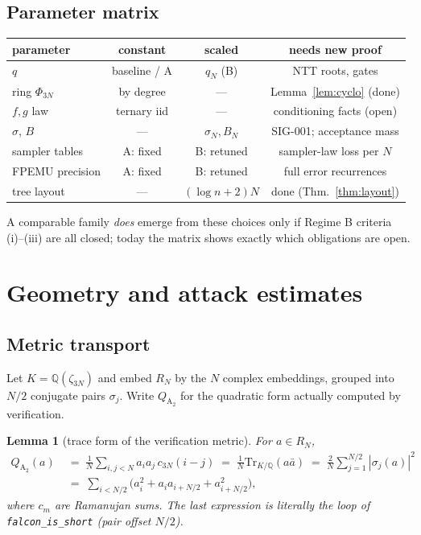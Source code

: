 \documentclass[11pt,a4paper]{article}
\newtheorem{lemma}{Lemma}
\theoremstyle{remark}
\newcommand{\Atwo}{Q_{\mathrm{A}_2}}
\begin{document}
\subsection{Parameter matrix}
\begin{center}
\begin{tabular}{lccc}
\toprule
parameter & constant & scaled & needs new proof \\
\midrule
$q$ & baseline / A & $q_N$ (B) & NTT roots, gates \\
ring $\Phi_{3N}$ & by degree & --- & Lemma~\ref{lem:cyclo} (done) \\
$f,g$ law & ternary iid & --- & conditioning facts (open) \\
$\sigma$, $B$ & --- & $\sigma_N,B_N$ & SIG-001; acceptance mass \\
sampler tables & A: fixed & B: retuned & sampler-law loss per $N$ \\
FPEMU precision & A: fixed & B: retuned & full error recurrences \\
tree layout & --- & $(\log n{+}2)N$ & done (Thm.~\ref{thm:layout}) \\
\bottomrule
\end{tabular}
\end{center}
A comparable family \emph{does} emerge from these choices only if Regime B
criteria (i)--(iii) are all closed; today the matrix shows exactly which
obligations are open.

\section{Geometry and attack estimates}
\label{sec:geometry}

\subsection{Metric transport}
Let $K=\mathbb Q(\zeta_{3N})$ and embed $R_N$ by the $N$ complex embeddings,
grouped into $N/2$ conjugate pairs $\sigma_j$. Write $\Atwo$ for the
quadratic form actually computed by verification.

\begin{lemma}[trace form of the verification metric]\label{lem:trace}
For $a\in R_N$,
\begin{align*}
 \Atwo(a)\;&=\;\frac1N\sum_{i,j<N} a_i a_j\, c_{3N}(i-j)
 \;=\;\frac1N\mathrm{Tr}_{K/\mathbb Q}(a\bar a)
 \;=\;\frac{2}{N}\sum_{j=1}^{N/2}|\sigma_j(a)|^2\\
 &=\;\sum_{i<N/2}\bigl(a_i^2+a_i a_{i+N/2}+a_{i+N/2}^2\bigr),
\end{align*}
where $c_m$ are Ramanujan sums. The last expression is literally the loop of
\texttt{falcon\_is\_short} (pair offset $N/2$).
\end{lemma}
\end{document}
